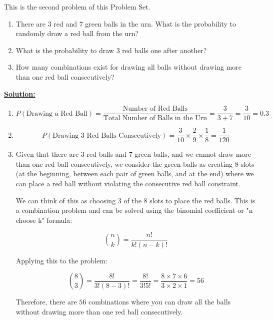 \documentclass[11pt]{article}
\def\sol{\underline{\textbf{Solution:}}\hskip 4pt}
\begin{document}
This is the second problem of this Problem Set.

\begin{enumerate}[label=(\alph*)]
\item There are 3 red and 7 green balls in the urn. What is the probability to randomly draw a red ball from the urn?

\item What is the probability to draw 3 red balls one after another?

\item How many combinations exist for drawing all balls without drawing more than one red ball consecutively?

\end{enumerate}

\sol

\begin{enumerate}[label=(\alph*)]
\item

\[
P(\text{Drawing a Red Ball}) = \frac{\text{Number of Red Balls}}{\text{Total Number of Balls in the Urn}} = \frac{3}{3 + 7} = \frac{3}{10} = 0.3
\]

\item

\[
P(\text{Drawing 3 Red Balls Consecutively}) = \frac{3}{10} \times \frac{2}{9} \times \frac{1}{8} = \frac{1}{120}
\]


\item

Given that there are $3$ red balls and $7$ green balls, and we cannot draw more than one red ball consecutively, we consider the green balls as creating $8$ slots (at the beginning, between each pair of green balls, and at the end) where we can place a red ball without violating the consecutive red ball constraint.

We can think of this as choosing $3$ of the $8$ slots to place the red balls. This is a combination problem and can be solved using the binomial coefficient or "n choose k" formula:

\[
{n \choose k} = \frac{n!}{k!(n - k)!}
\]

Applying this to the problem:

\[
{8 \choose 3} = \frac{8!}{3!(8 - 3)!} = \frac{8!}{3!5!} = \frac{8 \times 7 \times 6}{3 \times 2 \times 1} = 56
\]

Therefore, there are $56$ combinations where you can draw all the balls without drawing more than one red ball consecutively.

\end{enumerate}
\end{document}
